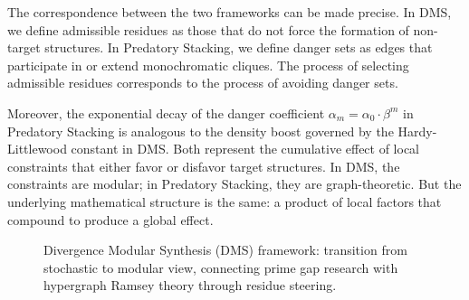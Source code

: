 \documentclass[12pt]{article}
\begin{document}
The correspondence between the two frameworks can be made precise. In DMS, we define admissible residues as those that do not force the formation of non-target structures. In Predatory Stacking, we define danger sets as edges that participate in or extend monochromatic cliques. The process of selecting admissible residues corresponds to the process of avoiding danger sets.

Moreover, the exponential decay of the danger coefficient $\alpha_m = \alpha_0 \cdot \beta^m$ in Predatory Stacking is analogous to the density boost governed by the Hardy-Littlewood constant in DMS. Both represent the cumulative effect of local constraints that either favor or disfavor target structures. In DMS, the constraints are modular; in Predatory Stacking, they are graph-theoretic. But the underlying mathematical structure is the same: a product of local factors that compound to produce a global effect.

\begin{figure}[h]
\centering
{}
\caption{Divergence Modular Synthesis (DMS) framework: transition from stochastic to modular view, connecting prime gap research with hypergraph Ramsey theory through residue steering.}
\label{fig:dms}
\end{figure}
\end{document}
